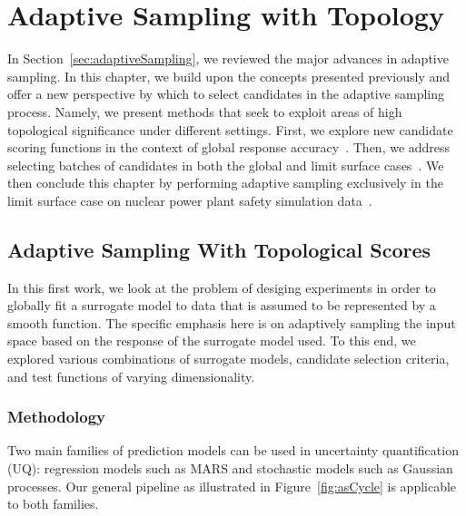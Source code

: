 
\chapter{Adaptive Sampling with Topology}
\label{ch:adaptiveSampling}

In Section~\ref{sec:adaptiveSampling}, we reviewed the major advances in adaptive sampling.
%
In this chapter, we build upon the concepts presented previously and offer a new perspective by which to select candidates in the adaptive sampling process.
%
Namely, we present methods that seek to exploit areas of high topological significance under different settings.
%
First, we explore new candidate scoring functions in the context of global response accuracy~\cite{MaljovecWangKupresanin2013}.
%
Then, we address selecting batches of candidates in both the global and limit surface cases~\cite{MaljovecWangMoeller2014}.
%
We then conclude this chapter by performing adaptive sampling exclusively in the limit surface case on nuclear power plant safety simulation data~\cite{MaljovecWangMandelli2013b}.

\section{Adaptive Sampling With Topological Scores}
\label{paper:ijuq2013}
In this first work, we look at the problem of desiging experiments in order to globally fit a surrogate model to data that is assumed to be represented by a smooth function.
%
The specific emphasis here is on adaptively sampling the input space based on the response of the surrogate model used.
%
To this end, we explored various combinations of surrogate models, candidate selection criteria, and test functions of varying dimensionality.

\subsection{Methodology}

Two main families of prediction models can be used in uncertainty quantification (UQ): regression models such as MARS and stochastic models such as Gaussian processes.
%
Our general pipeline as illustrated in Figure~\ref{fig:asCycle} is applicable to both families.

